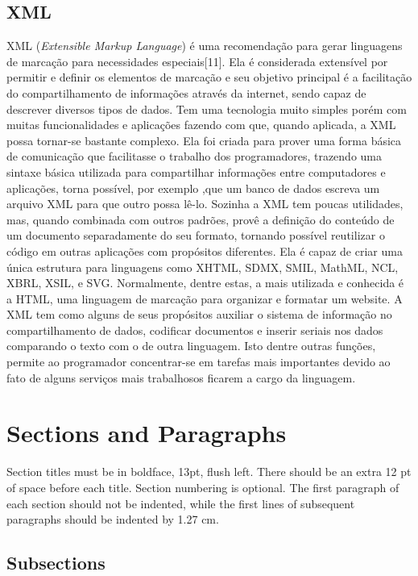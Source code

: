 \documentclass[12pt]{article}
\begin{document}
\subsection{XML}
XML (\textit{Extensible Markup Language}) é uma recomendação para gerar linguagens de marcação para necessidades especiais[11]. Ela é considerada extensível por permitir e definir os elementos de marcação e seu objetivo principal é a facilitação do compartilhamento de informações através da internet, sendo capaz de descrever diversos tipos de dados. Tem uma tecnologia muito simples porém com muitas funcionalidades e aplicações fazendo com que, quando aplicada, a XML possa tornar-se bastante complexo. 
Ela foi criada para prover uma forma básica de comunicação que facilitasse o trabalho dos programadores, trazendo uma sintaxe básica utilizada para compartilhar informações entre computadores e aplicações,  torna possível, por exemplo ,que um banco de dados escreva um arquivo XML para que outro possa lê-lo. 
Sozinha a XML tem poucas utilidades, mas, quando combinada com outros padrões, provê a definição do conteúdo de um documento separadamente do seu formato, tornando possível reutilizar o código em outras aplicações com propósitos diferentes. Ela é capaz de criar uma única estrutura para linguagens como XHTML, SDMX, SMIL, MathML, NCL, XBRL, XSIL, e SVG. Normalmente, dentre estas, a mais utilizada e conhecida é a HTML, uma linguagem de marcação para organizar e formatar um website.
A XML tem como alguns de seus propósitos auxiliar o sistema de informação no compartilhamento de dados, codificar documentos e inserir seriais nos dados comparando o texto com o de outra linguagem. Isto dentre outras funções, permite ao programador concentrar-se em tarefas mais importantes devido ao fato de alguns serviços mais trabalhosos ficarem a cargo da linguagem.
	
	
\section{Sections and Paragraphs}
Section titles must be in boldface, 13pt, flush left. There should be an extra
12 pt of space before each title. Section numbering is optional. The first
paragraph of each section should not be indented, while the first lines of
subsequent paragraphs should be indented by 1.27 cm.

\subsection{Subsections}
\end{document}
